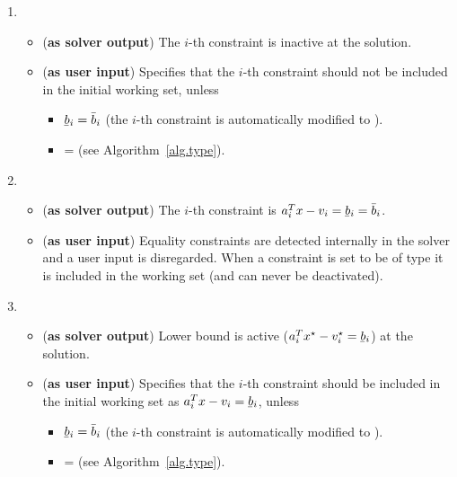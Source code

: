 \documentclass[12pt,a4paper]{article}
\newcommand{\ubar}[1]{\underaccent{\bar}{#1}}
\begin{document}
\begin{enumerate}
\item {}

  \begin{itemize}
  \item ({\bf as solver output}) The $i$-th constraint is inactive at the solution.
  \item ({\bf as user input}) Specifies that the $i$-th constraint should not be included in
    the initial working set, unless
    \begin{itemize}
    \item[\ding{237}] $\ubar{b}_i = \bar{b}_i$ (the $i$-th constraint is automatically modified to
      ).
    \item[\ding{237}]  =  (see Algorithm~\ref{alg.type}).
    \end{itemize}
  \end{itemize}

\item {}

  \begin{itemize}
  \item ({\bf as solver output}) The $i$-th constraint is $a_i^Tx - v_i = \ubar{b}_i = \bar{b}_i$.
  \item ({\bf as user input}) Equality constraints are detected internally in the solver and
    a user input  is disregarded. When a constraint is set to be of type
     it is included in the working set (and can never be deactivated).
  \end{itemize}

\item {}

  \begin{itemize}
  \item ({\bf as solver output}) Lower bound is active ($a_i^Tx^{\star} - v_i^{\star} = \ubar{b}_i$) at the solution.
  \item ({\bf as user input}) Specifies that the $i$-th constraint should be included in the
    initial working set as $a_i^Tx - v_i = \ubar{b}_i$, unless
    \begin{itemize}
    \item[\ding{237}] $\ubar{b}_i = \bar{b}_i$ (the $i$-th constraint is automatically modified to
      ).
    \item[\ding{237}]  =  (see Algorithm~\ref{alg.type}).
    \end{itemize}
  \end{itemize}


\end{enumerate}
\end{document}
